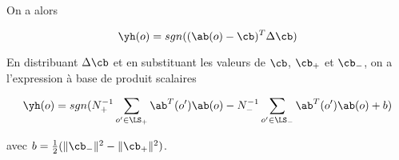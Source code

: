 	On a alors
	
	$$\yh(o) = sgn((\ab(o) - \cb)^T \Delta \cb)$$
	
	
	En distribuant $\Delta \cb$ et en substituant les valeurs de $\cb$, $\cb_+$ et $\cb_-$, on a l'expression à base de produit scalaires
	
	$$\yh(o) = sgn(N_+^{-1} \sum_{o' \in \LS_+} \ab^T(o')\ab(o) - N_-^{-1} \sum_{o' \in \LS_-}\ab^T(o') \ab(o) + b)$$
	
	avec $b = \frac{1}{2} (\Vert \cb_- \Vert^2 - \Vert \cb_+ \Vert^2)$.
	